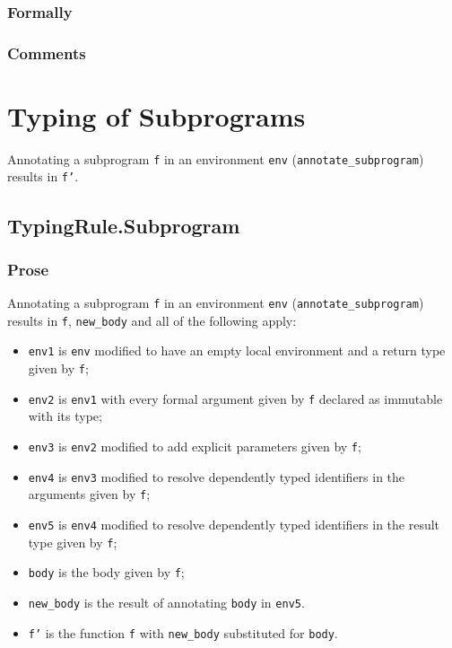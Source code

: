 \documentclass{book}
\begin{document}
  \subsection{Formally}

  \subsection{Comments}

\chapter{Typing of Subprograms}

Annotating a subprogram \texttt{f} in an environment \texttt{env}
(\texttt{annotate\_subprogram}) results in \texttt{f'}.

\section{TypingRule.Subprogram \label{sec:TypingRule.Subprogram}}

  \subsection{Prose}
Annotating a subprogram \texttt{f} in an environment \texttt{env}
(\texttt{annotate\_subprogram}) results in \texttt{f}, \texttt{new\_body} and all of
the following apply:
 \begin{itemize}
   \item \texttt{env1} is \texttt{env} modified to have an empty local
     environment and a return type given by \texttt{f};
   \item \texttt{env2} is \texttt{env1} with every formal argument given by
     \texttt{f} declared as immutable with its type;
   \item \texttt{env3} is \texttt{env2} modified to add explicit parameters
     given by \texttt{f};
   \item \texttt{env4} is \texttt{env3} modified to resolve dependently typed
     identifiers in the arguments given by \texttt{f};
   \item \texttt{env5} is \texttt{env4} modified to resolve dependently typed
     identifiers in the result type given by \texttt{f};
   \item \texttt{body} is the body given by \texttt{f};
   \item \texttt{new\_body} is the result of annotating \texttt{body} in
     \texttt{env5}.
   \item \texttt{f'} is the function \texttt{f} with \texttt{new\_body} substituted for \texttt{body}.
 \end{itemize}
\end{document}
